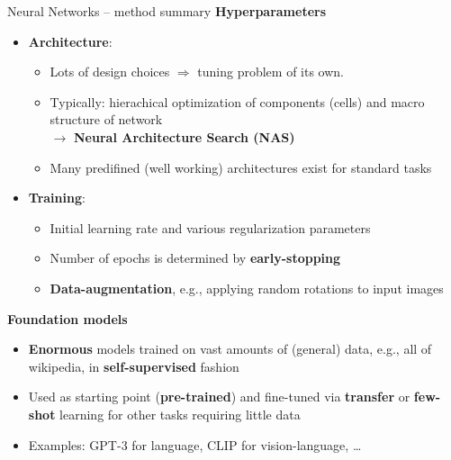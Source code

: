 \documentclass[11pt,compress,t,notes=noshow, xcolor=table]{beamer}
\newcommand{\highlight}[1]{\textcolor{hlcol}{\textbf{#1}}}
\begin{document}
\begin{frame2}{Neural Networks -- method summary}
\highlight{Hyperparameters}

\begin{itemize}
  \item \textbf{Architecture}:
  \begin{itemize}
    \item Lots of design choices $\Rightarrow$ tuning problem of its own.
    \item Typically: hierachical optimization of components (cells) and macro structure of network\\ 
    $\rightarrow$ \textbf{Neural Architecture Search (NAS)}
    \item Many predifined (well working) architectures exist for standard tasks
  \end{itemize}
  \item \textbf{Training}:
  \begin{itemize}
    \item Initial learning rate and various regularization parameters
    \item Number of epochs is determined by \textbf{early-stopping}
    \item \textbf{Data-augmentation}, e.g., applying random rotations to input images
  \end{itemize}
\end{itemize}

\medskip

\framebreak

\highlight{Foundation models}

\begin{itemize}
    \item \textbf{Enormous} models trained on vast amounts of (general) data, e.g., all of wikipedia, in \textbf{self-supervised} fashion
    \item Used as starting point (\textbf{pre-trained}) and fine-tuned via \textbf{transfer} or \textbf{few-shot} learning for other tasks requiring little data
    \item Examples: GPT-3 for language, CLIP for vision-language, \dots
\end{itemize}



\end{frame2}
\end{document}
